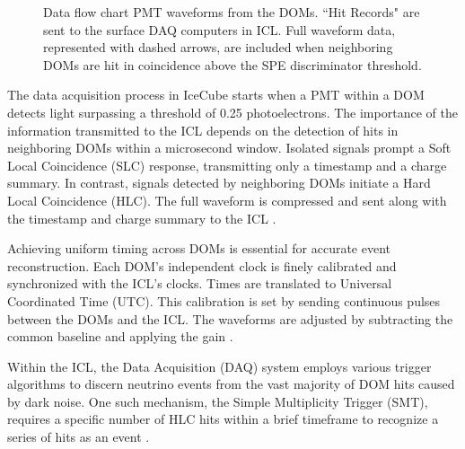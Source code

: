 \begin{figure}
    \caption{Data flow chart PMT waveforms from the DOMs. “Hit Records" are sent to the surface DAQ computers in ICL. Full waveform data, represented with dashed arrows, are included when neighboring DOMs are hit in coincidence above the SPE discriminator threshold.}
    \label{fig:IC3_dataflow}
\end{figure}

The data acquisition process in IceCube starts when a PMT within a DOM detects light surpassing a threshold of 0.25 photoelectrons.
The importance of the information transmitted to the ICL depends on the detection of hits in neighboring DOMs within a microsecond window.
Isolated signals prompt a Soft Local Coincidence (SLC) response, transmitting only a timestamp and a charge summary.
In contrast, signals detected by neighboring DOMs initiate a Hard Local Coincidence (HLC).
The full waveform is compressed and sent along with the timestamp and charge summary to the ICL \cite{IC3_thedetector}.

Achieving uniform timing across DOMs is essential for accurate event reconstruction.
Each DOM's independent clock is finely calibrated and synchronized with the ICL's clocks.
Times are translated to Universal Coordinated Time (UTC).
This calibration is set by sending continuous pulses between the DOMs and the ICL.
The waveforms are adjusted by subtracting the common baseline and applying the gain \cite{IC3_thedetector}.

Within the ICL, the Data Acquisition (DAQ) system employs various trigger algorithms to discern neutrino events from the vast majority of DOM hits caused by dark noise.
One such mechanism, the Simple Multiplicity Trigger (SMT), requires a specific number of HLC hits within a brief timeframe to recognize a series of hits as an event \cite{IC3_thedetector}.


